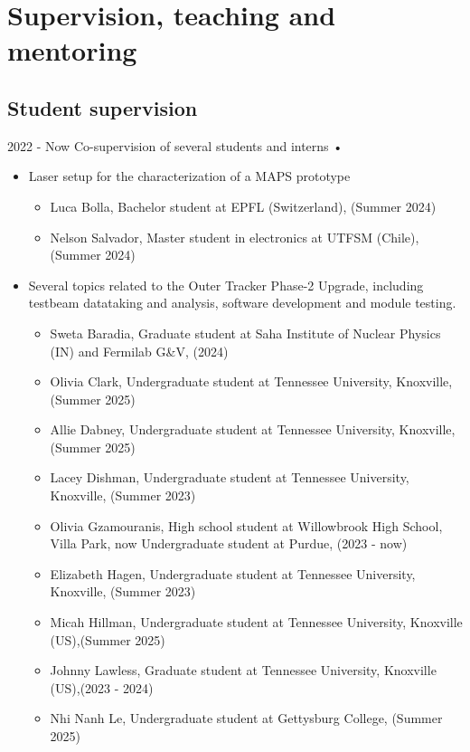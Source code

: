 \section{Supervision, teaching and mentoring}

\subsection{Student supervision}
   \teaching
    {2022 - Now}
    {Co-supervision of several students and interns • }{
    \begin{itemize}
    \item Laser setup for the characterization of a MAPS prototype
	\begin{itemize}
	\item Luca Bolla, Bachelor student at EPFL (Switzerland), (Summer 2024)
	\item Nelson Salvador, Master student in electronics at UTFSM (Chile), (Summer 2024)
	\end{itemize}
    \item Several topics related to the  Outer Tracker Phase-2 Upgrade, including testbeam datataking and analysis, software development and module testing.
    \begin{itemize}
    \item Sweta Baradia, Graduate student at Saha Institute of Nuclear Physics (IN) and Fermilab G\&V, (2024)
    \item Olivia Clark, Undergraduate student at Tennessee University, Knoxville, (Summer 2025) 
    \item Allie Dabney, Undergraduate student at Tennessee University, Knoxville, (Summer 2025) 
    \item Lacey Dishman, Undergraduate student at Tennessee University, Knoxville, (Summer 2023) 
    \item Olivia Gzamouranis, High school student at Willowbrook High School, Villa Park, now Undergraduate student at Purdue, (2023 - now)
    \item Elizabeth Hagen, Undergraduate student at Tennessee University, Knoxville, (Summer 2023)
    \item Micah Hillman, Undergraduate student at Tennessee University, Knoxville (US),(Summer 2025)
    \item Johnny Lawless, Graduate student at Tennessee University, Knoxville (US),(2023 - 2024)
	\item Nhi Nanh Le, Undergraduate student at Gettysburg College, (Summer 2025)    

\end{itemize}
\end{itemize}}
